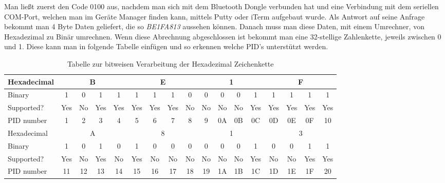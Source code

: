 Man ließt zuerst den Code 0100 aus, nachdem man sich mit dem Bluetooth Dongle verbunden hat und eine Verbindung mit dem seriellen COM-Port, welchen man im Geräte Manager finden kann, mittels Putty oder iTerm aufgebaut wurde.
Als Antwort auf seine Anfrage bekommt man 4 Byte Daten geliefert, die so \textit{BE1FA813} aussehen können. Danach muss man diese Daten, mit einem Umrechner, von Hexadezimal zu Binär umrechnen. Wenn diese Abrechnung abgeschlossen ist bekommt man eine 32-stellige Zahlenkette, jeweils zwischen 0 und 1. 
Diese kann man in folgende Tabelle einfügen und so erkennen welche PID's unterstützt werden.

\begin{table}[!htb]
\centering
\begin{tabular}{|l|c|c|c|c|c|c|c|c|c|c|c|c|c|c|c|c|}
\hline
Hexadecimal & \multicolumn{4}{c|}{B} & \multicolumn{4}{c|}{E} & \multicolumn{4}{c|}{1} & \multicolumn{4}{c|}{F} \\ \hline
Binary & 1 & 0 & 1 & 1 & 1 & 1 & 1 & 0 & 0 & 0 & 0 & 1 & 1 & 1 & 1 & 1 \\ \hline
Supported? & \cellcolor[HTML]{9AFF99}Yes & \cellcolor[HTML]{FD6864}No & \cellcolor[HTML]{9AFF99}Yes & \cellcolor[HTML]{9AFF99}Yes & \cellcolor[HTML]{9AFF99}Yes & \cellcolor[HTML]{9AFF99}Yes & \cellcolor[HTML]{9AFF99}Yes & \cellcolor[HTML]{FD6864}No & \cellcolor[HTML]{FD6864}No & \cellcolor[HTML]{FD6864}No & \cellcolor[HTML]{FD6864}No & \cellcolor[HTML]{9AFF99}Yes & \cellcolor[HTML]{9AFF99}Yes & \cellcolor[HTML]{9AFF99}Yes & \cellcolor[HTML]{9AFF99}Yes & \cellcolor[HTML]{9AFF99}Yes \\ \hline
PID number & 1 & 2 & 3 & 4 & 5 & 6 & 7 & 8 & 9 & 0A & 0B & 0C & 0D & 0E & 0F & 10 \\ \hline
Hexadecimal & \multicolumn{4}{c|}{A} & \multicolumn{4}{c|}{8} & \multicolumn{4}{c|}{1} & \multicolumn{4}{c|}{3} \\ \hline
Binary & 1 & 0 & 1 & 0 & 1 & 0 & 0 & 0 & 0 & 0 & 0 & 1 & 0 & 0 & 1 & 1 \\ \hline
Supported? & \cellcolor[HTML]{9AFF99}Yes & \cellcolor[HTML]{FD6864}No & \cellcolor[HTML]{9AFF99}Yes & \cellcolor[HTML]{FD6864}No & \cellcolor[HTML]{9AFF99}Yes & \cellcolor[HTML]{FD6864}No & \cellcolor[HTML]{FD6864}No & \cellcolor[HTML]{FD6864}No & \cellcolor[HTML]{FD6864}No & \cellcolor[HTML]{FD6864}No & \cellcolor[HTML]{FD6864}No & \cellcolor[HTML]{9AFF99}Yes & \cellcolor[HTML]{FD6864}No & \cellcolor[HTML]{FD6864}No & \cellcolor[HTML]{9AFF99}Yes & \cellcolor[HTML]{9AFF99}Yes \\ \hline
PID number & 11 & 12 & 13 & 14 & 15 & 16 & 17 & 18 & 19 & 1A & 1B & 1C & 1D & 1E & 1F & 20 \\ \hline
\end{tabular}
\caption{Tabelle zur bitweisen Verarbeitung der Hexadezimal Zeichenkette}
\label{tableHextoPID}
\end{table}

